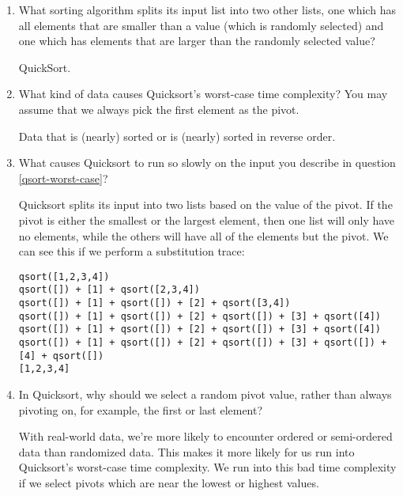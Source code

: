 \documentclass[11pt]{article}
\newenvironment{answer}{\large\lstset{basicstyle=\tiny\ttfamily}\color{white}}{}
\newenvironment{answer}{\large\lstset{basicstyle=\large\ttfamily}\color{red}}{}
\begin{document}
\begin{enumerate}
\item What sorting algorithm splits its input list into two other lists, one
      which has all elements that are smaller than a value (which is randomly
      selected) and one which has elements that are larger than the
      randomly selected value?

    \begin{answer}
    QuickSort.
    \end{answer}

\item\label{qsort-worst-case} What kind of data causes Quicksort's worst-case
      time complexity? You may assume that we always pick the first element as
      the pivot.

      \begin{answer}
      Data that is (nearly) sorted or is (nearly) sorted in reverse order.
      \end{answer}

\item What causes Quicksort to run so slowly on the input you describe in
      question \ref{qsort-worst-case}?

    \begin{answer}
    Quicksort splits its input into two lists based on the value of the pivot.
    If the pivot is either the smallest or the largest element, then one list
    will only have no elements, while the others will have all of the elements
    but the pivot. We can see this if we perform a substitution trace:
\begin{verbatim}
qsort([1,2,3,4])
qsort([]) + [1] + qsort([2,3,4])
qsort([]) + [1] + qsort([]) + [2] + qsort([3,4])
qsort([]) + [1] + qsort([]) + [2] + qsort([]) + [3] + qsort([4])
qsort([]) + [1] + qsort([]) + [2] + qsort([]) + [3] + qsort([4])
qsort([]) + [1] + qsort([]) + [2] + qsort([]) + [3] + qsort([]) + [4] + qsort([])
[1,2,3,4]
\end{verbatim}
    \end{answer}

\item In Quicksort, why should we select a random pivot value, rather than always
      pivoting on, for example, the first or last element?

      \begin{answer}
      With real-world data, we're more likely to encounter ordered or
      semi-ordered data than randomized data. This makes it more likely for us
      run into Quicksort's worst-case time complexity. We run into this bad
      time complexity if we select pivots which are near the lowest or highest
      values.


\end{answer}
\end{enumerate}
\end{document}
